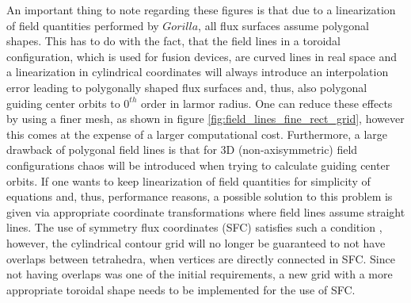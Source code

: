 \documentclass[./main.tex]{subfiles}
\begin{document}
An important thing to note regarding these figures is that due to a linearization of field quantities performed by $Gorilla$, all flux surfaces assume polygonal shapes. This has to do with the fact, that the field lines in a toroidal configuration, which is used for fusion devices, are curved lines in real space and a linearization in cylindrical coordinates will always introduce an interpolation error leading to polygonally shaped flux surfaces and, thus, also polygonal guiding center orbits to $0^{th}$ order in larmor radius. One can reduce these effects by using a finer mesh, as shown in figure \ref{fig:field_lines_fine_rect_grid}, however this comes at the expense of a larger computational cost.
Furthermore, a large drawback of polygonal field lines is that for 3D (non-axisymmetric) field configurations chaos will be introduced when trying to calculate guiding center orbits. If one wants to keep linearization of field quantities for simplicity of equations and, thus, performance reasons, a possible solution to this problem is given via appropriate coordinate transformations where field lines assume straight lines. The use of symmetry flux coordinates (SFC) satisfies such a condition \cite{haeseleer}, however, the cylindrical contour grid will no longer be guaranteed to not have overlaps between tetrahedra, when vertices are directly connected in SFC. Since not having overlaps was one of the initial requirements, a new grid with a more appropriate toroidal shape needs to be implemented for the use of SFC.

\end{document}
